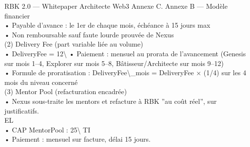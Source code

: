 \documentclass[12pt,landscape,a4paper]{article}
\begin{document}
RBK 2.0 — Whitepaper Architecte Web3                                                                                    Annexe C. Annexe B — Modèle financier\\
\vspace{0.5em}
\vspace{0.5em}
• Payable d’avance : le 1er de chaque mois, échéance à 15 jours max\\
\vspace{0.5em}
• Non remboursable sauf faute lourde prouvée de Nexus\\
\vspace{0.5em}
(2) Delivery Fee (part variable liée au volume)\\
\vspace{0.5em}
• DeliveryFee = 12\textbackslash{}%
\vspace{0.5em}
• Paiement : mensuel au prorata de l’avancement (Genesis sur mois 1–4, Explorer sur mois 5–8, Bâtisseur/Architecte sur mois 9–12)\\
\vspace{0.5em}
• Formule de proratisation : DeliveryFee\textbackslash{}_mois = DeliveryFee × (1/4) sur les 4 mois du niveau concerné\\
\vspace{0.5em}
(3) Mentor Pool (refacturation encadrée)\\
\vspace{0.5em}
• Nexus sous-traite les mentors et refacture à RBK ”au coût réel”, sur justificatifs.\\
\vspace{0.5em}
\vspace{0.5em}
\vspace{0.5em}
\vspace{0.5em}
EL\\
• CAP MentorPool : 25\textbackslash{}%
\vspace{0.5em}
\vspace{0.5em}
\vspace{0.5em}
\vspace{0.5em}
TI\\
• Paiement : mensuel sur facture, délai 15 jours.\\
\vspace{0.5em}
\vspace{0.5em}
\vspace{0.5em}
\end{document}
